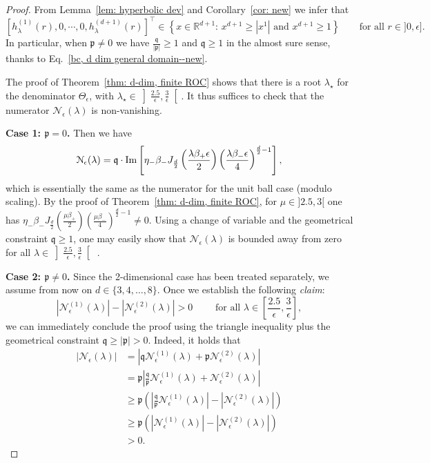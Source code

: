 \documentclass[11pt,a4paper,english,reqno]{amsart}
\theoremstyle{plain}
\newcommand{\e}{\epsilon}
\newcommand{\1}{\mathbbm{1}}
\begin{document}
\begin{proof}
From Lemma~\ref{lem: hyperbolic dev}  and Corollary~\ref{cor: new} we infer that
\begin{equation*}
\left[h^{(1)}_\lambda(r), 0, \cdots, 0 , h^{(d+1)}_\lambda(r)\right]^\top \in \left\{ x \in \mathbb{R}^{d+1} :\,  x^{d+1}\geq \left|x^1\right|\text{ and } x^{d+1} \geq 1 \right\}\qquad\text{for all } r \in ]0,\e].
\end{equation*} In particular, when $\mathfrak{p}\neq 0$ we have $\frac{\mathfrak{q}}{|\mathfrak{p}|} \geq 1$ and $ \mathfrak{q} \geq 1$ in the almost sure sense, thanks to Eq.~\eqref{bc, d dim general domain--new}.


The proof of Theorem~\ref{thm: d-dim, finite ROC} shows that there is a root $\lambda_\star$ for the denominator $\Theta_{\e}$, with $\lambda_\star \in \left]\frac{2.5}{\e}, \frac{3}{\e} \right[$. It thus suffices to check that the numerator $\mathcal{N}_{\e}(\lambda)$ is non-vanishing.


\noindent
{\bf Case 1: $\mathfrak{p}=0$.} Then we have $$\mathcal{N}_{\e}(\lambda) = \mathfrak{q}\cdot {\rm Im}\left[ \eta_{-}\beta_{-}J_{\frac{d}{2}}\left(\frac{\lambda\beta_+\e}{2}\right)\left(\frac{\lambda\beta_- \e}{4}\right)^{\frac{d}{2}-1}\right],$$ which is essentially the same as the numerator for the unit ball case (modulo scaling). By the proof of Theorem~\ref{thm: d-dim, finite ROC}, for $\mu \in ]2.5, 3[$ one has $\eta_{-}\beta_{-}J_{\frac{d}{2}}\left(\frac{\mu\beta_+}{2}\right)\left(\frac{\mu\beta_- }{4}\right)^{\frac{d}{2}-1}\neq 0$. Using a change of variable and the geometrical constraint $\mathfrak{q}\geq 1$, one may easily show that  $\mathcal{N}_{\e}(\lambda)$ is bounded away from zero for all $\lambda \in \left]\frac{2.5}{\e}, \frac{3}{\e}\right[$ . 

\noindent
{\bf Case 2: $\mathfrak{p}\neq 0$.} Since the 2-dimensional case has been treated separately, we assume from now on $d \in \{3,4,\ldots,8\}$. Once we establish the following \emph{claim}:
\begin{equation}\label{new-claim to conclude}
\left| \mathcal{N}_{\e}^{(1)}(\lambda) \right| -\left|  \mathcal{N}_{\e}^{(2)}(\lambda)\right| > 0 \qquad\text{ for all } \lambda \in \left[\frac{2.5}{\e}, \frac{3}{\e}\right],
\end{equation}
we can immediately conclude the proof using the triangle inequality plus the geometrical constraint $\mathfrak{q}\geq |\mathfrak{p}|>0$. Indeed, it holds that
\begin{align*}
\left|\mathcal{N}_{\e}(\lambda)\right| &=  \left|\mathfrak{q} \mathcal{N}_{\e}^{(1)}(\lambda) + \mathfrak{p} \mathcal{N}_{\e}^{(2)}(\lambda)\right|\\
&=\mathfrak{p} \left|\frac{\mathfrak{q}}{\mathfrak{p}} \mathcal{N}_{\e}^{(1)}(\lambda) +  \mathcal{N}_{\e}^{(2)}(\lambda)\right| \\
&\geq  \mathfrak{p} \left(\left|\frac{\mathfrak{q}}{\mathfrak{p}} \mathcal{N}_{\e}^{(1)}(\lambda) \right| -\left|  \mathcal{N}_{\e}^{(2)}(\lambda)\right| \right)\\
&\geq  \mathfrak{p} \left(\left| \mathcal{N}_{\e}^{(1)}(\lambda) \right| -\left|  \mathcal{N}_{\e}^{(2)}(\lambda)\right| \right)\\ 
&> 0.
\end{align*}



\end{proof}
\end{document}
